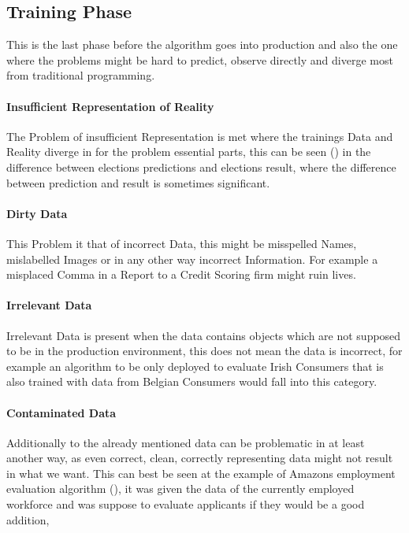 \subsection{Training Phase}
This is the last phase before the algorithm goes into production and also the one where the problems might be hard to predict, observe directly and diverge most from traditional programming. 

\paragraph{Insufficient Representation of Reality}
The Problem of insufficient Representation is met where 
the trainings Data and Reality diverge in for the problem 
essential parts, this can be seen (\cite{2016}) in the difference between 
elections predictions and elections result, where the difference
between prediction and result is sometimes significant.

\paragraph{Dirty Data}
This Problem it that of incorrect Data, this might be misspelled Names, mislabelled Images or in any other way incorrect Information. For example a misplaced Comma in a Report to a Credit Scoring firm might ruin lives.

\paragraph{Irrelevant Data}
Irrelevant Data is present when the data contains 
objects which are not supposed to be in the production 
environment, this does not mean the data is incorrect,
for example an algorithm to be only deployed to evaluate
Irish Consumers that is also trained with data from 
Belgian Consumers would fall into this category.

\paragraph{Contaminated Data}
Additionally to the already mentioned data can be problematic 
in at least another way, as even correct, clean, correctly representing data might not result in what we want.
This can best be seen at the example of Amazons employment evaluation algorithm (\cite{Higginbottom2018}), it was given the data of the currently employed workforce and was suppose to evaluate applicants if they would be a good addition, 


